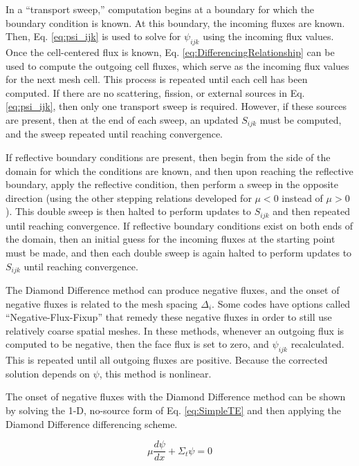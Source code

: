 \documentclass[10pt]{article}
\begin{document}
\begin{flushleft}
In a ``transport sweep,'' computation begins at a boundary for which the boundary condition is known. At this boundary, the incoming fluxes are known. Then, Eq. \eqref{eq:psi_ijk} is used to solve for \(\psi_{ijk}\) using the incoming flux values. Once the cell-centered flux is known, Eq. \eqref{eq:DifferencingRelationship} can be used to compute the outgoing cell fluxes, which serve as the incoming flux values for the next mesh cell. This process is repeated until each cell has been computed. If there are no scattering, fission, or external sources in Eq. \eqref{eq:psi_ijk}, then only one transport sweep is required. However, if these sources are present, then at the end of each sweep, an updated \(S_{ijk}\) must be computed, and the sweep repeated until reaching convergence. 

If reflective boundary conditions are present, then begin from the side of the domain for which the conditions are known, and then upon reaching the reflective boundary, apply the reflective condition, then perform a sweep in the opposite direction (using the other stepping relations developed for \(\mu<0\) instead of \(\mu>0\)). This double sweep is then halted to perform updates to \(S_{ijk}\) and then repeated until reaching convergence. If reflective boundary conditions exist on both ends of the domain, then an initial guess for the incoming fluxes at the starting point must be made, and then each double sweep is again halted to perform updates to \(S_{ijk}\) until reaching convergence. 

The Diamond Difference method can produce negative fluxes, and the onset of negative fluxes is related to the mesh spacing \(\Delta_i\). Some codes have options called ``Negative-Flux-Fixup'' that remedy these negative fluxes in order to still use relatively coarse spatial meshes. In these methods, whenever an outgoing flux is computed to be negative, then the face flux is set to zero, and \(\psi_{ijk}\) recalculated. This is repeated until all outgoing fluxes are positive. Because the corrected solution depends on \(\psi\), this method is nonlinear.  

\begin{tcolorbox}[breakable]
The onset of negative fluxes with the Diamond Difference method can be shown by solving the 1-D, no-source form of Eq. \eqref{eq:SimpleTE} and then applying the Diamond Difference differencing scheme.

\begin{equation}
\label{eq:Ex2}
\mu\frac{d\psi}{dx}+\Sigma_t\psi=0
\end{equation}


\end{tcolorbox}
\end{flushleft}
\end{document}
